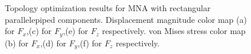 \begin{figure}[hbt!]
{                                                       }
                                                     
       \caption{Topology optimization results for MNA with rectangular parallelepiped components.  Displacement magnitude color map (a) for $F_x$,(c) for $F_y$,(e) for $F_z$ respectively.
       von Mises stress color map (b) for $F_x$,(d) for $F_y$,(f) for $F_z$ respectively. \label{fig.3.39}} 
   \end{figure}
   \clearpage
